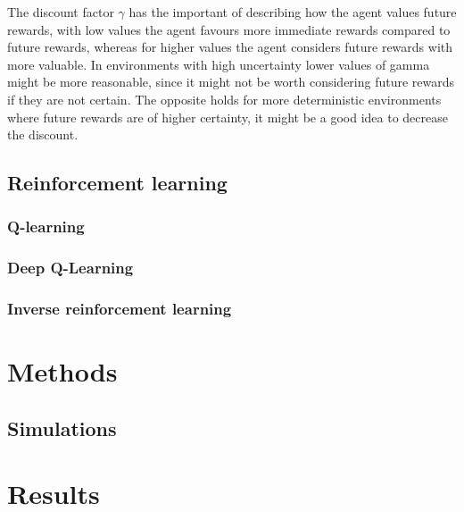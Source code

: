 \documentclass{report}
\theoremstyle{definition}
\begin{document}
The discount factor $\gamma$ has the important of describing how the agent values future rewards, with low values the agent favours more immediate rewards compared to future rewards, whereas for higher values the agent considers future rewards with more valuable. In environments with high uncertainty lower values of gamma might be more reasonable, since it might not be worth considering future rewards if they are not certain. The opposite holds for more deterministic environments where future rewards are of higher certainty, it might be a good idea to decrease the discount.


\section{Reinforcement learning}

\subsection{Q-learning}

\subsection{Deep Q-Learning}

\subsection{Inverse reinforcement learning}




\chapter{Methods}

\section{Simulations}




\chapter{Results}
\end{document}
